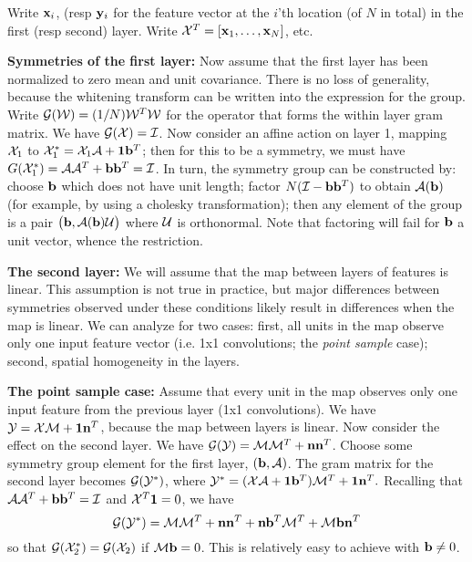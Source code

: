 \documentclass[runningheads]{llncs}
\newcommand{\vect}[1]{{\bf {#1}}}
\newcommand{\matx}[1]{{\cal {#1}}}
\begin{document}
Write $\vect{x}_{i}$, (resp $\vect{y}_i$ for the feature vector at the $i$'th location (of $N$ in total)
in the first (resp second) layer.  Write $\matx{X}^T=\left[\vect{x}_{1}, \ldots,
\vect{x}_{N}\right]$, etc.   

{\bf Symmetries of the first layer:} Now assume that the first layer has been normalized to zero mean and
unit covariance.  There is no loss of generality, because the whitening transform
can be written into the expression for the group. Write ${\cal
  G}(\matx{W})=(1/N)\matx{W}^T\matx{W}$ for the operator that forms
the within layer gram matrix. We have ${\cal G}(\matx{X})=\matx{I}$.   
Now consider an affine action on layer 1, mapping $\matx{X}_1$ to $\matx{X}_1^*=\matx{X}_1 \matx{A}+\vect{1}\vect{b}^T$; then for this to be a symmetry, we must have
$G(\matx{X}_1^*)= \matx{A}\matx{A}^T+\vect{b}\vect{b}^T=\matx{I}$.  In
turn, the symmetry group can be constructed by: choose $\vect{b}$
which does not have unit length; factor
$N(\matx{I}-\vect{b}\vect{b}^T)$ to obtain $\matx{A}(\vect{b})$ (for
example, by using a cholesky transformation); then any element of the
group is a pair $\left(\vect{b}, \matx{A}(\vect{b})\matx{U}\right)$
where $\matx{U}$ is orthonormal.  Note that factoring will fail for
$\vect{b}$ a unit vector, whence the restriction. 

{\bf The second layer:}   We will assume that the map between layers
of features is linear.  This assumption is not true in practice, but major
differences between symmetries observed under these conditions likely
result in differences when the map is linear.  We can analyze for two
cases: first, all units in the map observe only one input feature
vector (i.e. 1x1 convolutions; the {\em point sample} case); second, spatial homogeneity in the
layers.

{\bf The point sample case:} Assume that every unit in the map
observes only one input feature from the previous layer (1x1
convolutions).   We have $\matx{Y}=\matx{X}\matx{M}+\vect{1}\vect{n}^T$, because the map 
between layers is linear. Now consider the effect on the second layer.
We have ${\cal G}(\matx{Y})=\matx{M}\matx{M}^T+\vect{n}\vect{n}^T$.
Choose some symmetry group element for the first layer,
$\left(\vect{b}, \matx{A}\right)$.  The gram matrix for the second
layer becomes ${\cal G}(\matx{Y}^*)$, where
$\matx{Y}^*=(\matx{X} \matx{A}+\vect{1}\vect{b}^T)\matx{M}^T+\vect{1}\vect{n}^T.$
Recalling that $\matx{A}\matx{A}^T+\vect{b}\vect{b}^T=\matx{I}$ and
$\matx{X}^T\vect{1}=0$, we have 
\[
{\cal
  G}(\matx{Y}^*)=\matx{M}\matx{M}^T+\vect{n}\vect{n}^T+\vect{n}\vect{b}^T\matx{M}^T+\matx{M}\vect{b}\vect{n}^T
\]
so that ${\cal G}(\matx{X}_2^*)={\cal G}(\matx{X}_2)$ if
$\matx{M}\vect{b}=0$.  This is relatively easy to achieve with
$\vect{b}\neq 0$.
\end{document}
